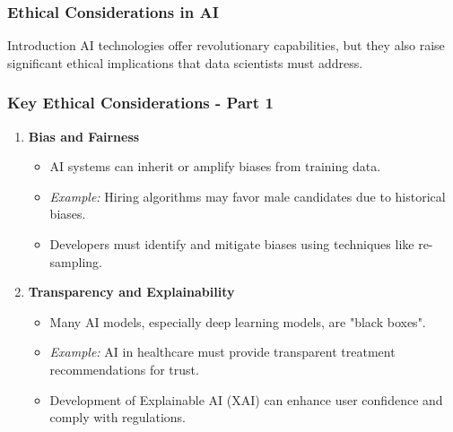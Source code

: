 \documentclass[aspectratio=169]{beamer}
\begin{document}
\begin{frame}[fragile]
    \frametitle{Ethical Considerations in AI}
    \begin{block}{Introduction}
        AI technologies offer revolutionary capabilities, but they also raise significant ethical implications that data scientists must address.
    \end{block}
\end{frame}

\begin{frame}[fragile]
    \frametitle{Key Ethical Considerations - Part 1}
    \begin{enumerate}
        \item \textbf{Bias and Fairness}
            \begin{itemize}
                \item AI systems can inherit or amplify biases from training data.
                \item \textit{Example:} Hiring algorithms may favor male candidates due to historical biases.
                \item Developers must identify and mitigate biases using techniques like re-sampling.
            \end{itemize}
        
        \item \textbf{Transparency and Explainability}
            \begin{itemize}
                \item Many AI models, especially deep learning models, are "black boxes".
                \item \textit{Example:} AI in healthcare must provide transparent treatment recommendations for trust.
                \item Development of Explainable AI (XAI) can enhance user confidence and comply with regulations.
            \end{itemize}
    \end{enumerate}
\end{frame}
\end{document}

